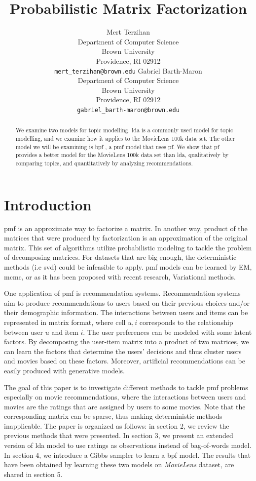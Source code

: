 \documentclass{article} %
\title{Probabilistic Matrix Factorization}
\author{ 
  Mert Terzihan \\
  Department of Computer Science\\
  Brown University\\
  Providence, RI 02912 \\
  \texttt{mert\_terzihan@brown.edu}
  \And
  Gabriel Barth-Maron \\
  Department of Computer Science \\
  Brown University \\
  Providence, RI 02912 \\
  \texttt{gabriel\_barth-maron@brown.edu}\\
}
\begin{document}
\maketitle
\begin{abstract}
We examine two models for topic modelling. \Gls{lda} is a commonly used model
for topic modelling, and we examine how it applies to the MovieLens 100k \cite{movielens100k} data set. The other model we will be examining is \Gls{bpf} \cite{gopalan2013scalable}, a \Gls{pmf} model that uses \Gls{pf}. We show that
\gls{pf} provides a better model for the MovieLens 100k data set than \gls{lda}, qualitatively by comparing topics, and quantitatively by analyzing recommendations.
\end{abstract}

\section{Introduction}
\Gls{pmf} is an approximate way to factorize a matrix. In another way, product 
of the matrices that were produced by factorization is an approximation of the 
original matrix. This set of algorithms utilize probabilistic modeling to tackle 
the problem of decomposing matrices. For datasets that are big enough, the 
deterministic methods (i.e \Gls{svd}) could be infeasible to apply. \Gls{pmf} 
models can be learned by EM, \Gls{mcmc}, or as it has been proposed with recent 
research, Variational methods. 

One application of \Gls{pmf} is recommendation systems. Recommendation systems 
aim to produce recommendations to users based on their previous choices and/or 
their demographic information. The interactions between users and items can be 
represented in matrix format, where cell $u,i$ corresponds to the relationship 
between user $u$ and item $i$. The user preferences can be modeled with some 
latent factors. By decomposing the user-item matrix into a product of two 
matrices, we can learn the factors that determine the users' decisions and thus 
cluster users and movies based on these factors. Moreover, artificial 
recommendations can be easily produced with generative models. 

The goal of this paper is to investigate different methods to tackle \Gls{pmf} 
problems especially on movie recommendations, where the interactions between 
users and movies are the ratings that are assigned by users to some movies. Note 
that the corresponding matrix can be sparse, thus making deterministic methods 
inapplicable. The paper is organized as follows: in section 2, we review the 
previous methods that were presented. In section 3, we present an extended 
version of \Gls{lda} model to use ratings as observations instead of bag-of-words 
model. In section 4, we introduce a Gibbs sampler to learn a \Gls{bpf} model. 
The results that have been obtained by learning these two models on 
\textit{MovieLens} dataset, are shared in section 5.
\end{document}
